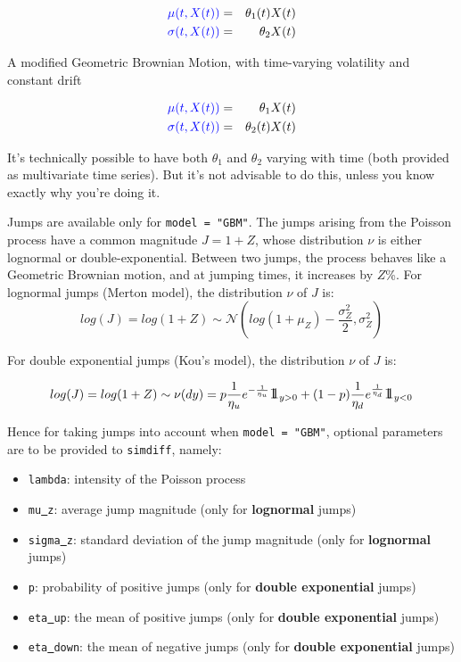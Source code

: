 \documentclass[a4paper]{article}\usepackage[]{graphicx}\usepackage[]{color}
\newcommand{\II}{\mbox{\large 1\hskip -0,353em 1}}
\newcommand{\code}[1]{\mbox{\texttt{#1}}}
\newcommand{\MN}{\mathcal{N}}
\begin{document}
\begin{itemize}
\begin{eqnarray*}
\textcolor{blue}{\mu(t, X(t))} &=& \theta_1(t) X(t)\\
\textcolor{blue}{\sigma(t, X(t))} &=& \theta_2 X(t)\\
\end{eqnarray*}

A modified Geometric Brownian Motion, with time-varying volatility and constant drift

\begin{eqnarray*}
\textcolor{blue}{\mu(t, X(t))} &=& \theta_1 X(t)\\ 
\textcolor{blue}{\sigma(t, X(t))} &=& \theta_2(t) X(t)\\
\end{eqnarray*}
\end{itemize}

It's technically possible to have both $\theta_1$ and $\theta_2$ varying with time (both provided as multivariate time series). But it's not advisable to do this, unless you know exactly why you're doing it. 

\medskip

Jumps are available only for \code{model = "GBM"}. The jumps arising from the Poisson process have a common magnitude $J = 1+Z$, whose distribution $\nu$ is either lognormal or double-exponential. Between two jumps, the process behaves like a Geometric Brownian motion, and at jumping times, it increases by $Z$\%. For lognormal jumps (Merton model), the distribution $\nu$ of $J$ is:
\begin{equation}
log(J) = log(1+Z) \sim \MN(log(1+\mu_Z) - \frac{\sigma_Z^2}{2}, \sigma_Z^2)
\end{equation}

For double exponential jumps (Kou's model), the distribution $\nu$ of $J$ is:

\begin{equation}
log(J) = log(1+Z) \sim \nu(dy) = p\frac{1}{\eta_u} e^{- \frac{1}{\eta_u}} \II_{y > 0} + (1-p)\frac{1}{\eta_d} e^{\frac{1}{\eta_d}} \II_{y < 0}
\end{equation}

Hence for taking jumps into account when \code{model = "GBM"}, optional parameters are to be provided to \code{simdiff}, namely:


\begin{itemize}
\item \code{lambda}: intensity of the Poisson process
\item \code{mu\underline{ }z}: average jump magnitude (only for {\bf lognormal} jumps)
\item \code{sigma\underline{ }z}: standard deviation of the jump magnitude (only for {\bf lognormal} jumps)
\item \code{p}: probability of positive jumps (only for {\bf double exponential} jumps)
\item \code{eta\underline{ }up}: the mean of positive jumps (only for {\bf double exponential} jumps)
\item \code{eta\underline{ }down}: the mean of negative jumps (only for {\bf double exponential} jumps)
\end{itemize}
\end{document}
